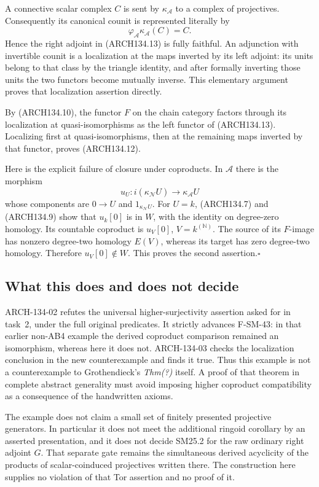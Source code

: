 A connective scalar complex $C$ is sent by $\kappa_{\mathcal A}$ to
a complex of projectives.  Consequently its canonical counit is
represented literally by
\[
       \varphi_{\mathcal A}\kappa_{\mathcal A}(C)=C.
\]
Hence the right adjoint in (ARCH134.13) is fully faithful.  An
adjunction with invertible counit is a localization at the maps
inverted by its left adjoint: its units belong to that class by the
triangle identity, and after formally inverting those units the two
functors become mutually inverse.  This elementary argument proves
that localization assertion directly.

By (ARCH134.10), the functor $F$ on the chain category factors through
its localization at quasi-isomorphisms as the left functor of
(ARCH134.13).  Localizing first at quasi-isomorphisms, then at the
remaining maps inverted by that functor, proves (ARCH134.12).

Here is the explicit failure of closure under coproducts.  In
$\mathcal A$ there is the morphism
\[
 u_U:i(\kappa_{\mathcal N}U)\longrightarrow\kappa_{\mathcal A}U
\]
whose components are $0\to U$ and $1_{\kappa_{\mathcal N}U}$.
For $U=k$, (ARCH134.7) and (ARCH134.9) show that $u_k[0]$ is in
$W$, with the identity on degree-zero homology.  Its countable
coproduct is $u_V[0]$, $V=k^{(\mathbb N)}$.  The source of its
$F$-image has nonzero degree-two homology $E(V)$, whereas its target
has zero degree-two homology.  Therefore $u_V[0]\notin W$.
This proves the second assertion.\hfill$\square$

\subsection{What this does and does not decide}
ARCH-134-02 refutes the universal higher-surjectivity assertion asked
for in task~2, under the full original predicates.  It strictly
advances F-SM-43: in that earlier non-AB4 example the derived
coproduct comparison remained an isomorphism, whereas here it does
not.  ARCH-134-03 checks the localization conclusion in the new
counterexample and finds it true.  Thus this example is not a
counterexample to Grothendieck's \emph{Thm(?)} itself.  A proof of that
theorem in complete abstract generality must avoid imposing higher
coproduct compatibility as a consequence of the handwritten axioms.

The example does not claim a small set of finitely presented
projective generators.  In particular it does not meet the additional
ringoid corollary by an asserted presentation, and it does not decide
SM25.2 for the raw ordinary right adjoint $G$.  That separate gate
remains the simultaneous derived acyclicity of the products of
scalar-coinduced projectives written there.  The construction here
supplies no violation of that Tor assertion and no proof of it.

